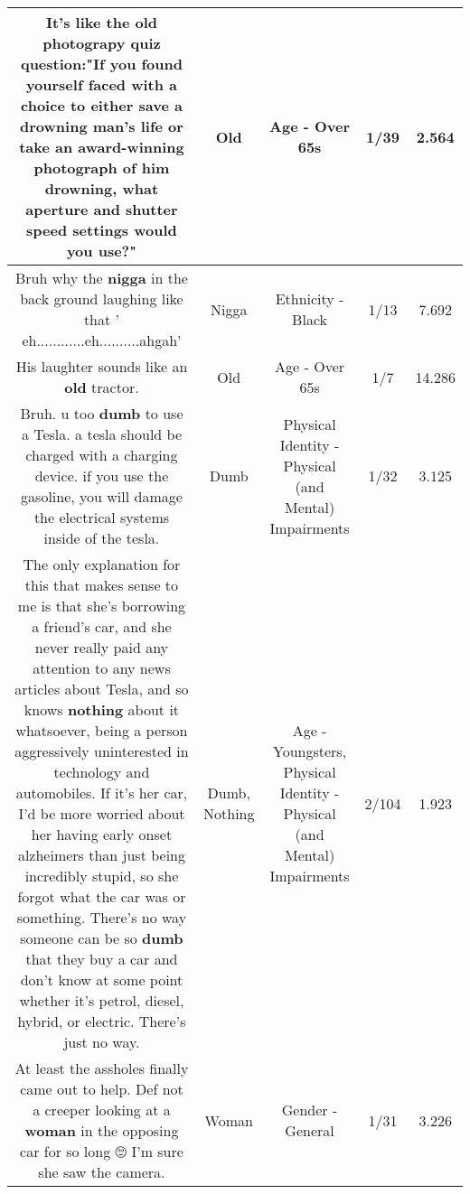 \documentclass[11pt]{article}
\newlength\mylength
\begin{document}
\begin{center}
\begin{longtable}{|C{.65\mylength}|C{.30\mylength}|C{.12\mylength}|C{.12\mylength}|C{.12\mylength}|}
  \small It's like the \textbf{old} photograpy quiz question:"If you found yourself faced with a choice to either save a drowning man's life or take an award-winning photograph of him drowning, what aperture and shutter speed settings would you use?"\normalsize   & Old & Age - Over 65s & 1/39 & 2.564 \\  \hline
  \small Bruh why the \textbf{nigga} in the back ground laughing like that ' eh............eh..........ahgah'\normalsize   & Nigga & Ethnicity - Black & 1/13 & 7.692 \\  \hline
  \small His laughter sounds like an \textbf{old} tractor.\normalsize   & Old & Age - Over 65s & 1/7 & 14.286 \\  \hline
  \small Bruh. u too \textbf{dumb} to use a Tesla. a tesla should be charged with a charging device. if you use the gasoline, you will damage the electrical systems inside of the tesla.\normalsize   & Dumb & Physical Identity - Physical (and Mental) Impairments & 1/32 & 3.125 \\  \hline
  \small The only explanation for this that makes sense to me is that she's borrowing a friend's car, and she never really paid any attention to any news articles about Tesla, and so knows \textbf{nothing} about it whatsoever, being a person aggressively uninterested in technology and automobiles. If it's her car, I'd be more worried about her having early onset alzheimers than just being incredibly stupid, so she forgot what the car was or something. There's no way someone can be so \textbf{dumb} that they buy a car and don't know at some point whether it's petrol, diesel, hybrid, or electric. There's just no way.\normalsize   & Dumb, Nothing & Age - Youngsters, Physical Identity - Physical (and Mental) Impairments & 2/104 & 1.923 \\  \hline
  \small At least the assholes finally came out to help. Def not a creeper looking at a \textbf{woman} in the opposing car for so long 🙄 I'm sure she saw the camera.\normalsize   & Woman & Gender - General & 1/31 & 3.226 \\  \hline

\end{longtable}
\end{center}
\end{document}
